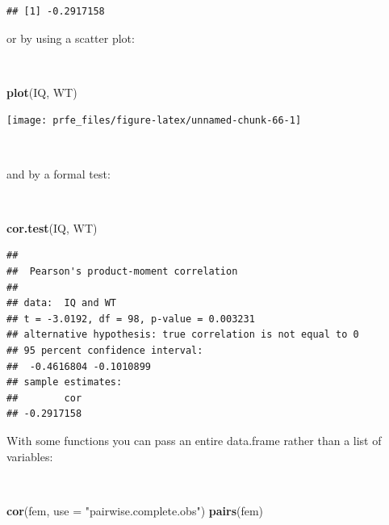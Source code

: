 \documentclass[12pt,a4paper]{book}
\newenvironment{Shaded}{\begin{snugshade}}{\end{snugshade}}
\newcommand{\KeywordTok}[1]{\textcolor[rgb]{0.13,0.29,0.53}{\textbf{#1}}}
\newcommand{\DataTypeTok}[1]{\textcolor[rgb]{0.13,0.29,0.53}{#1}}
\newcommand{\StringTok}[1]{\textcolor[rgb]{0.31,0.60,0.02}{#1}}
\newcommand{\NormalTok}[1]{#1}
\theoremstyle{definition}
\theoremstyle{definition}
\theoremstyle{definition}
\theoremstyle{remark}
\begin{document}
\begin{verbatim}
## [1] -0.2917158
\end{verbatim}

\newpage

or by using a scatter plot:

~

\begin{Shaded}
\begin{Highlighting}[]
\KeywordTok{plot}\NormalTok{(IQ, WT)}
\end{Highlighting}
\end{Shaded}

\begin{center}\texttt{[image: prfe\_files/figure-latex/unnamed-chunk-66-1]} \end{center}

~

and by a formal test:

~

\begin{Shaded}
\begin{Highlighting}[]
\KeywordTok{cor.test}\NormalTok{(IQ, WT)}
\end{Highlighting}
\end{Shaded}

\begin{verbatim}
## 
##  Pearson's product-moment correlation
## 
## data:  IQ and WT
## t = -3.0192, df = 98, p-value = 0.003231
## alternative hypothesis: true correlation is not equal to 0
## 95 percent confidence interval:
##  -0.4616804 -0.1010899
## sample estimates:
##        cor 
## -0.2917158
\end{verbatim}

\newpage

With some functions you can pass an entire data.frame rather than a list
of variables:

~

\begin{Shaded}
\begin{Highlighting}[]
\KeywordTok{cor}\NormalTok{(fem, }\DataTypeTok{use =} \StringTok{"pairwise.complete.obs"}\NormalTok{)}
\KeywordTok{pairs}\NormalTok{(fem)}
\end{Highlighting}
\end{Shaded}
\end{document}

